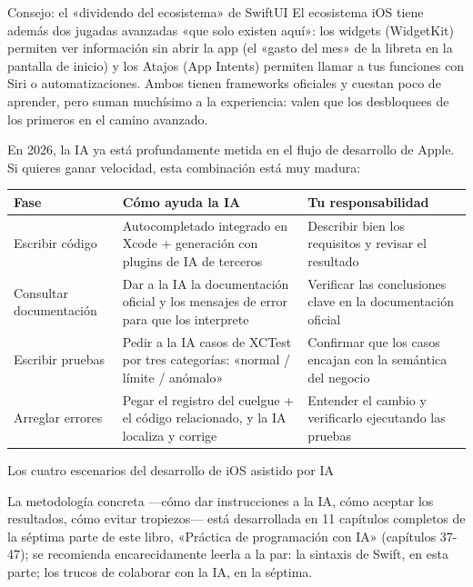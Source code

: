 \begin{tcbinfo}{Consejo: el «dividendo del ecosistema» de SwiftUI}
El ecosistema iOS tiene además dos jugadas avanzadas «que solo existen aquí»: los widgets (WidgetKit) permiten ver información sin abrir la app (el «gasto del mes» de la libreta en la pantalla de inicio) y los Atajos (App Intents) permiten llamar a tus funciones con Siri o automatizaciones. Ambos tienen frameworks oficiales y cuestan poco de aprender, pero suman muchísimo a la experiencia: valen que los desbloquees de los primeros en el camino avanzado.

\end{tcbinfo}


En 2026, la IA ya está profundamente metida en el flujo de desarrollo de Apple. Si quieres ganar velocidad, esta combinación está muy madura:

\begin{center}
\begin{tabularx}{\linewidth}{|X|X|X|}
\hline
\textbf{Fase} & \textbf{Cómo ayuda la IA} & \textbf{Tu responsabilidad} \tabularnewline
\hline
Escribir código & Autocompletado integrado en Xcode + generación con plugins de IA de terceros & Describir bien los requisitos y revisar el resultado \tabularnewline
Consultar documentación & Dar a la IA la documentación oficial y los mensajes de error para que los interprete & Verificar las conclusiones clave en la documentación oficial \tabularnewline
Escribir pruebas & Pedir a la IA casos de XCTest por tres categorías: «normal / límite / anómalo» & Confirmar que los casos encajan con la semántica del negocio \tabularnewline
Arreglar errores & Pegar el registro del cuelgue + el código relacionado, y la IA localiza y corrige & Entender el cambio y verificarlo ejecutando las pruebas \tabularnewline
\hline
\end{tabularx}
\end{center}

\begin{center}\small\color{gray}Los cuatro escenarios del desarrollo de iOS asistido por IA\end{center}

La metodología concreta —cómo dar instrucciones a la IA, cómo aceptar los resultados, cómo evitar tropiezos— está desarrollada en 11 capítulos completos de la séptima parte de este libro, «Práctica de programación con IA» (capítulos 37-47); se recomienda encarecidamente leerla a la par: la sintaxis de Swift, en esta parte; los trucos de colaborar con la IA, en la séptima.

